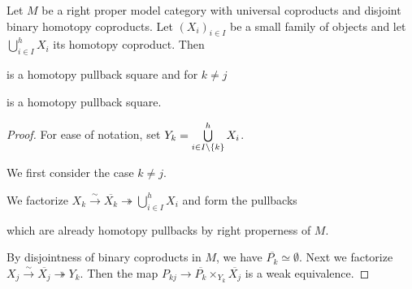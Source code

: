 \begin{corollary}\label{cor:genCoproductComponentPb} %
    Let $M$ be a right proper model category with universal coproducts and disjoint binary homotopy coproducts.
    Let $\left(X_i\right)_{i\in I}$ be a small family of objects and let $\bigcup\limits_{i\in I}^h X_i$ its homotopy coproduct.
    Then
    \begin{center}
    \end{center}
    is a homotopy pullback square and for $k\neq j$
    \begin{center}
    \end{center}
    is a homotopy pullback square.
    \begin{proof}
        For ease of notation, set $Y_k=\bigcup\limits_{i\in I\setminus{\left\lbrace k\right\rbrace}}^hX_i$.

        We first consider the case $k\neq j$.

        We factorize $X_k\xrightarrow{\sim}\overline{X_k}\twoheadrightarrow\bigcup\limits_{i\in I}^h X_i$ and form the pullbacks
        \begin{center}
        \end{center}
        which are already homotopy pullbacks by right properness of $M$.
        
        By disjointness of binary coproducts in $M$, we have $\overline{P_{k}}\simeq\emptyset$.
        Next we factorize $X_j\xrightarrow{\sim}\overline{X_j}\twoheadrightarrow Y_k$.
        Then the map $P_{kj}\to\overline{P_k}\times_{Y_k}\overline{X_j}$ is a weak equivalence.
        

\end{proof}
\end{corollary}
